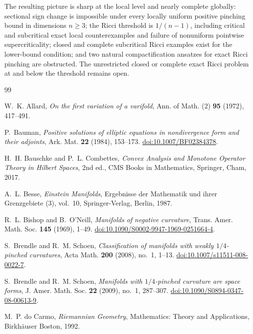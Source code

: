 \documentclass[11pt,reqno]{amsart}
\theoremstyle{definition}
\theoremstyle{remark}
\begin{document}
The resulting picture is sharp at the local level and nearly complete globally: sectional sign change is impossible under every locally uniform positive pinching bound in dimensions $n\ge3$; the Ricci threshold is $1/(n-1)$, including critical and subcritical exact local counterexamples and failure of nonuniform pointwise supercriticality; closed and complete subcritical Ricci examples exist for the lower-bound condition; and two natural compactification ansatzes for exact Ricci pinching are obstructed.  The unrestricted closed or complete exact Ricci problem at and below the threshold remains open.

\begin{thebibliography}{99}
\footnotesize

W.~K. Allard,
\emph{On the first variation of a varifold},
Ann. of Math. (2) \textbf{95} (1972), 417--491.

P.~Bauman,
\emph{Positive solutions of elliptic equations in nondivergence form and their adjoints},
Ark. Mat. \textbf{22} (1984), 153--173.
\href{https://doi.org/10.1007/BF02384378}{doi:10.1007/BF02384378}.

H.~H. Bauschke and P.~L. Combettes,
\emph{Convex Analysis and Monotone Operator Theory in Hilbert Spaces},
2nd ed., CMS Books in Mathematics, Springer, Cham, 2017.

A.~L. Besse,
\emph{Einstein Manifolds},
Ergebnisse der Mathematik und ihrer Grenzgebiete (3), vol.~10,
Springer-Verlag, Berlin, 1987.

R.~L. Bishop and B.~O'Neill,
\emph{Manifolds of negative curvature},
Trans. Amer. Math. Soc. \textbf{145} (1969), 1--49.
\href{https://doi.org/10.1090/S0002-9947-1969-0251664-4}{doi:10.1090/S0002-9947-1969-0251664-4}.

S.~Brendle and R.~M. Schoen,
\emph{Classification of manifolds with weakly $1/4$-pinched curvatures},
Acta Math. \textbf{200} (2008), no.~1, 1--13.
\href{https://doi.org/10.1007/s11511-008-0022-7}{doi:10.1007/s11511-008-0022-7}.

S.~Brendle and R.~M. Schoen,
\emph{Manifolds with $1/4$-pinched curvature are space forms},
J. Amer. Math. Soc. \textbf{22} (2009), no.~1, 287--307.
\href{https://doi.org/10.1090/S0894-0347-08-00613-9}{doi:10.1090/S0894-0347-08-00613-9}.


M.~P. do Carmo,
\emph{Riemannian Geometry},
Mathematics: Theory and Applications, Birkh\"auser Boston, 1992.


\end{thebibliography}
\end{document}
